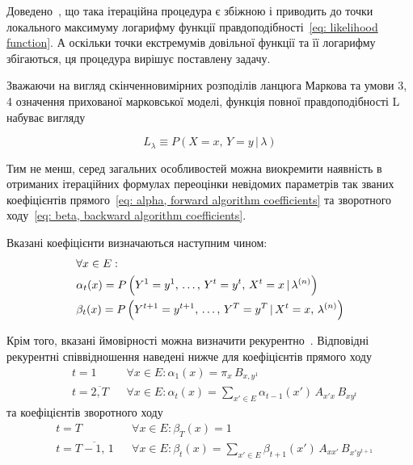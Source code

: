 Доведено~\cite[розділ 4]{Koski2001}, що така ітераційна процедура є збіжною і приводить до точки локального максимуму логарифму функції правдоподібності~\eqref{eq: likelihood function}. А оскільки точки екстремумів довільної функції та її логарифму збігаються, ця процедура вирішує поставлену задачу.

Зважаючи на вигляд скінченновимірних розподілів ланцюга Маркова та умови 3, 4 означення прихованої марковської моделі, функція повної правдоподібності L набуває вигляду

\begin{equation*}
    L_{\lambda} \equiv P\left( X=x,\,Y=y \,|\, \lambda \right)
\end{equation*}

Тим не менш, серед загальних особливостей можна виокремити наявність в отриманих ітераційних формулах переоцінки невідомих параметрів так званих коефіцієнтів прямого~\eqref{eq: alpha, forward algorithm coefficients} та зворотного ходу~\eqref{eq: beta, backward algorithm coefficients}.

Вказані коефіцієнти визначаються наступним чином:
\begin{align}
    & \forall x \in E: \notag \\
    & \alpha_t(x) = P\left( Y^1=y^1,\,\ldots,\,Y^t=y^t,\,X^t=x \,|\, \lambda^{(n)} \right) \label{eq: alpha, forward algorithm coefficients} \\
    & \beta_t(x) = P\left( Y^{t+1}=y^{t+1},\,\ldots,\,Y^T=y^T \,|\, X^t=x,\, \lambda^{(n)} \right) \label{eq: beta, backward algorithm coefficients}
\end{align}

Крім того, вказані ймовірності можна визначити рекурентно~\cite[розділ 5]{Nilsson2005}. Відповідні рекурентні співвідношення наведені нижче для коефіцієнтів прямого ходу
\begin{align*}
    & t = 1              && \forall x \in E: \alpha_1(x)=\pi_{x}\,B_{x,y^1} \\
    & t = \overline{2,T} && \forall x \in E: \alpha_{t}(x)=\sum\limits_{x'\in E}\alpha_{t-1}(x')\,A_{x'x}\,B_{xy^{t}} 
\end{align*}
та коефіцієнтів зворотного ходу
\begin{align*}
    & t = T                && \forall x \in E: \beta_T(x)=1 \\
    & t = \overline{T-1,\,1} && \forall x \in E: \beta_t(x)=\sum\limits_{x' \in E}\beta_{t+1}(x')\,A_{x x'}\,B_{x'y^{t+1}}
\end{align*}

